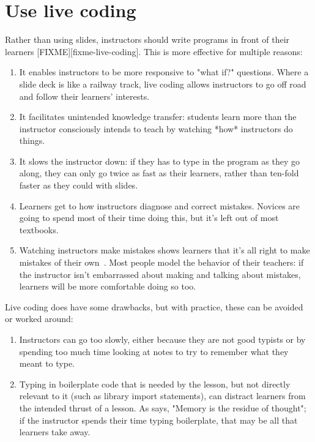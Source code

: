\documentclass{article}
\begin{document}
\section{Use live coding}

Rather than using slides,
instructors should write programs in front of their learners [FIXME][fixme-live-coding].
This is more effective for multiple reasons:

\begin{enumerate}
\item It enables instructors to be more responsive to "what if?"
    questions. Where a slide deck is like a railway track, live coding
    allows instructors to go off road and follow their learners'
    interests.

\item  It facilitates unintended knowledge transfer: students learn more
    than the instructor consciously intends to teach by watching *how*
    instructors do things.

\item  It slows the instructor down: if they has to type in the program
    as they go along, they can only go twice as fast as their
    learners, rather than ten-fold faster as they could with slides.

\item  Learners get to how instructors diagnose and correct
    mistakes. Novices are going to spend most of their time doing
    this, but it's left out of most textbooks.

\item  Watching instructors make mistakes shows learners that it's all
    right to make mistakes of their own~\citep{barker-live-coding}.  Most people model the
    behavior of their teachers: if the instructor isn't embarrassed
    about making and talking about mistakes, learners will be more
    comfortable doing so too.
\end{enumerate}

Live coding does have some drawbacks, but with practice, these can be
avoided or worked around:

\begin{enumerate}
\item  Instructors can go too slowly, either because they are not good
    typists or by spending too much time looking at notes to try to
    remember what they meant to type.

\item  Typing in boilerplate code that is needed by the lesson, but not
    directly relevant to it (such as library import statements), can
    distract learners from the intended thrust of a lesson.  As
    \citet{willingham-book} says, "Memory is the residue of thought";
    if the instructor spends their time typing boilerplate, that may
    be all that learners take away.
\end{enumerate}
\end{document}
